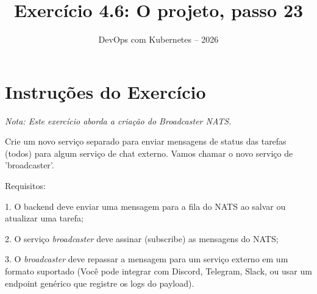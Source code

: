 \documentclass[11pt,a4paper]{article}
\title{\color{secondary}\Huge\textbf{Exercício 4.6: O projeto, passo 23}}
\author{\color{primary}DevOps com Kubernetes -- 2026}
\date{}
\begin{document}
\maketitle

\section*{\color{primary}Instruções do Exercício}
\begin{tcolorbox}[colback=blue!5!white,colframe=blue!75!black,title=Exercício 4.6: O projeto, passo 23]
\textit{Nota: Este exercício aborda a criação do Broadcaster NATS.}

Crie um novo serviço separado para enviar mensagens de status das tarefas (todos) para algum serviço de chat externo. Vamos chamar o novo serviço de 'broadcaster'.

Requisitos: 

1. O backend deve enviar uma mensagem para a fila do NATS ao salvar ou atualizar uma tarefa;

2. O serviço \textit{broadcaster} deve assinar (subscribe) as mensagens do NATS; 

3. O \textit{broadcaster} deve repassar a mensagem para um serviço externo em um formato suportado (Você pode integrar com Discord, Telegram, Slack, ou usar um endpoint genérico que registre os logs do payload).
\end{tcolorbox}
\end{document}
